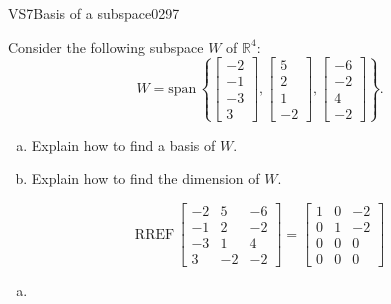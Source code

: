 \begin{exercise}{VS7}{Basis of a subspace}{0297} 
\begin{exerciseStatement} 

 Consider the following subspace \(W\) of \(\mathbb R^4\): \[W=\mathrm{span}\,\left\{ \left[\begin{array}{c}
-2 \\
-1 \\
-3 \\
3
\end{array}\right] , \left[\begin{array}{c}
5 \\
2 \\
1 \\
-2
\end{array}\right] , \left[\begin{array}{c}
-6 \\
-2 \\
4 \\
-2
\end{array}\right] \right\}.\] 

 

\begin{enumerate}[(a)]
\item 

Explain how to find a basis of \(W\).


\item 

Explain how to find the dimension of \(W\).


\end{enumerate}

     \end{exerciseStatement}
 \begin{exerciseAnswer} 

\[\mathrm{RREF}\,\left[\begin{array}{ccc}
-2 & 5 & -6 \\
-1 & 2 & -2 \\
-3 & 1 & 4 \\
3 & -2 & -2
\end{array}\right]=\left[\begin{array}{ccc}
1 & 0 & -2 \\
0 & 1 & -2 \\
0 & 0 & 0 \\
0 & 0 & 0
\end{array}\right]\]

 

\begin{enumerate}[(a)]
\item 


\end{enumerate}
\end{exerciseAnswer}
\end{exercise}
